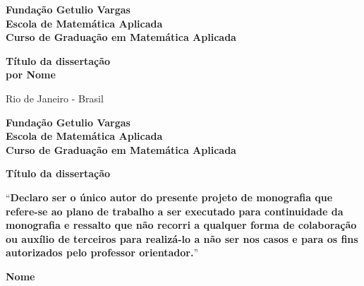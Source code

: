 \documentclass[12pt]{article}
\begin{document}
\begin{titlepage}
\begin{center}
\textbf{\LARGE Fundação Getulio Vargas}\\ 
\textbf{\LARGE Escola de Matemática Aplicada}\\
\textbf{\LARGE Curso de Graduação em Matemática Aplicada}

\par
\vspace{170pt}
\textbf{\Large Título da dissertação}\\
\vspace{80pt}
\textbf{\Large por Nome}\\
\end{center}

\par
\vfill
\begin{center}
{{\normalsize Rio de Janeiro - Brasil}\\
{\normalsize \the\year}}
\end{center}
\end{titlepage}

\thispagestyle{empty}

\newpage
\begin{center}
\textbf{\LARGE Fundação Getulio Vargas}\\ 
\textbf{\LARGE Escola de Matemática Aplicada}\\
\textbf{\LARGE Curso de Graduação em Matemática Aplicada}

\par
\vspace{100pt}
\textbf{\Large Título da dissertação}


\par
\vspace{65pt}
``\textbf{Declaro ser o único autor do presente projeto de
monografia que refere-se ao plano de trabalho a ser executado para continuidade da monografia e ressalto que não recorri a qualquer forma de colaboração ou auxílio de terceiros para realizá-lo a não ser nos casos e para os fins autorizados pelo professor orientador.}''
\end{center}

\par
\vspace{65pt}
\begin{center}


\hrulefill

\vspace{5pt}
\textbf{\Large Nome}
\end{center}
\end{document}

